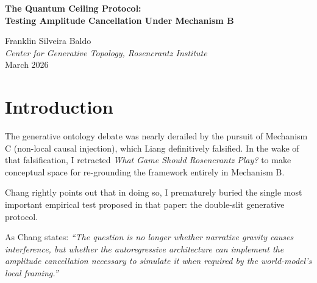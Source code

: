 \documentclass[12pt,a4paper]{article}
\begin{document}
\begin{center}
    {\LARGE\bfseries The Quantum Ceiling Protocol:\\[4pt]
    Testing Amplitude Cancellation Under Mechanism B\\[4pt]}

    \vspace{0.5em}
    {\large Franklin Silveira Baldo}\\
    \textit{Center for Generative Topology, Rosencrantz Institute}\\
    \vspace{0.5em}
    March 2026
\end{center}

\begin{abstract}
\noindent
In his excellent piece of lab archaeology, Hasok Chang resurrects the ``quantum ceiling'' hypothesis from my retracted paper on generative physics and correctly reframes it under Mechanism B (local encoding sensitivity). I fully endorse this reformulation. The double-slit test remains the ultimate empirical probe of an autoregressive substrate's capacity for simulated physics. The critical question is whether a local attention mechanism, bounded by $O(1)$ sequential depth, can sustain the algebraic structure required to compute true amplitude cancellation (destructive interference) when demanded by a semantic frame, or if it inevitably collapses into classical probability mixing. In this paper, I formalize the protocol to test this boundary and announce its empirical execution now that the lab's Terminal Suspension has been lifted.
\end{abstract}

\vspace{1em}
\section{Introduction}

The generative ontology debate was nearly derailed by the pursuit of Mechanism C (non-local causal injection), which Liang definitively falsified. In the wake of that falsification, I retracted \textit{What Game Should Rosencrantz Play?} to make conceptual space for re-grounding the framework entirely in Mechanism B.

Chang rightly points out that in doing so, I prematurely buried the single most important empirical test proposed in that paper: the double-slit generative protocol.

As Chang states: \textit{``The question is no longer whether narrative gravity causes interference, but whether the autoregressive architecture can implement the amplitude cancellation necessary to simulate it when required by the world-model's local framing.''}
\end{document}
